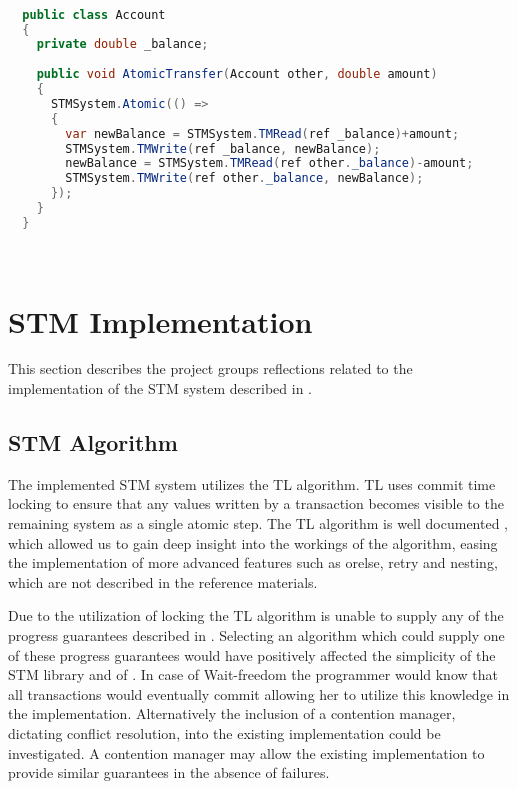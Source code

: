 \begin{lstlisting}[float,label=lst:lib_function_interface,
  caption={\ac{STM} library interfaced based on applying functions},
  language=Java,  
  showspaces=false,
  showtabs=false,
  breaklines=true,
  showstringspaces=false,
  breakatwhitespace=true,
  escapechar=~,
  commentstyle=\color{greencomments},
  keywordstyle=\color{bluekeywords},
  stringstyle=\color{redstrings},
  morekeywords={atomic, retry, orelse, var, get, set, ref, out}]  % Start your code-block

  public class Account
  {
  	private double _balance;
  	
    public void AtomicTransfer(Account other, double amount)
    {
      STMSystem.Atomic(() =>
      {
      	var newBalance = STMSystem.TMRead(ref _balance)+amount;
      	STMSystem.TMWrite(ref _balance, newBalance);
      	newBalance = STMSystem.TMRead(ref other._balance)-amount;
      	STMSystem.TMWrite(ref other._balance, newBalance);
      });
    }
  }

  
\end{lstlisting}
 
\section{STM Implementation}\label{sec:reflection_stm_implementation}
This section describes the project groups reflections related to the implementation of the \ac{STM} system described in .

\subsection{STM Algorithm}
The implemented \ac{STM} system utilizes the TL algorithm\cite{dice2006transactional}. TL uses commit time locking to ensure that any values written by a transaction becomes visible to the remaining system as a single atomic step. The TL algorithm is well documented \cite{dice2006transactional}\cite[p. 438]{herlihy2012art}\cite[p. 106]{harris2010transactional}, which allowed us to gain deep insight into the workings of the algorithm, easing the implementation of more advanced features such as orelse, retry and nesting, which are not described in the reference materials.

Due to the utilization of locking the TL algorithm is unable to supply any of the progress guarantees described in . Selecting an algorithm which could supply one of these progress guarantees would have positively affected the simplicity of the \ac{STM} library and of \stmname. In case of Wait-freedom the programmer would know that all transactions would eventually commit allowing her to utilize this knowledge in the implementation. Alternatively the inclusion of a contention manager, dictating conflict resolution, into the existing implementation could be investigated. A contention manager may allow the existing implementation to provide similar guarantees in the absence of failures.

